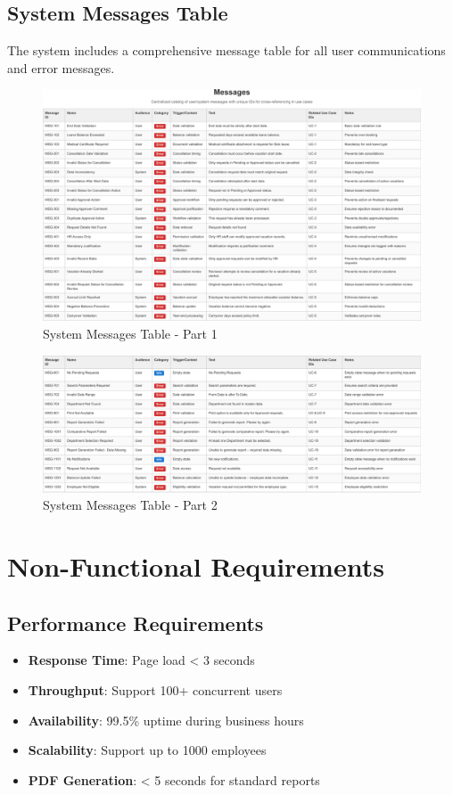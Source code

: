 \documentclass[12pt,a4paper]{article}
\begin{document}
\subsection{System Messages Table}
The system includes a comprehensive message table for all user communications and error messages.

\begin{figure}[H]
\centering
\includegraphics[width=1\textwidth]{Use-Cases/Messages-Table/Messages-Table-1.png}
\caption{System Messages Table - Part 1}
\label{fig:messages-table-1}
\end{figure}

\begin{figure}[H]
\centering
\includegraphics[width=1\textwidth]{Use-Cases/Messages-Table/Messages-Table-2.png}
\caption{System Messages Table - Part 2}
\label{fig:messages-table-2}
\end{figure}

\section{Non-Functional Requirements}

\subsection{Performance Requirements}
\begin{itemize}
    \item \textbf{Response Time}: Page load < 3 seconds
    \item \textbf{Throughput}: Support 100+ concurrent users
    \item \textbf{Availability}: 99.5\% uptime during business hours
    \item \textbf{Scalability}: Support up to 1000 employees
    \item \textbf{PDF Generation}: < 5 seconds for standard reports
\end{itemize}
\end{document}

